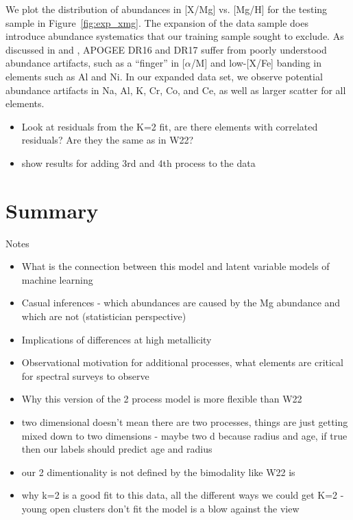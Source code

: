 \documentclass[modern]{aastex631}
\begin{document}
We plot the distribution of abundances in [X/Mg] vs. [Mg/H] for the testing sample in Figure~\ref{fig:exp_xmg}. The expansion of the data sample does introduce abundance systematics that our training sample sought to exclude. As discussed in \citet{jonsson2020} and \citet{griffith2021a}, APOGEE DR16 and DR17 suffer from poorly understood abundance artifacts, such as a ``finger'' in [$\alpha$/M] and low-[X/Fe] banding in elements such as Al and Ni. In our expanded data set, we observe potential abundance artifacts in Na, Al, K, Cr, Co, and Ce, as well as larger scatter for all elements.  



\begin{itemize}
    \item Look at residuals from the K=2 fit, are there elements with correlated residuals? Are they the same as in W22? 
    \item show results for adding 3rd and 4th process to the data
\end{itemize}


\section{Summary}\label{sec:summary}

Notes

\begin{itemize}
    \item What is the connection between this model and latent variable models of machine learning
    \item Casual inferences - which abundances are caused by the Mg abundance and which are not (statistician perspective)
    \item Implications of differences at high metallicity
    \item Observational motivation for additional processes, what elements are critical for spectral surveys to observe
    \item Why this version of the 2 process model is more flexible than W22
    \item two dimensional doesn't mean there are two processes, things are just getting mixed down to two dimensions  - maybe two d because radius and age, if true then our labels should predict age and radius 
    \item our 2 dimentionality is not defined by the bimodality like W22 is
    \item why k=2 is a good fit to this data, all the different ways we could get K=2 - young open clusters don't fit the model is a blow against the view
\end{itemize}
\end{document}
